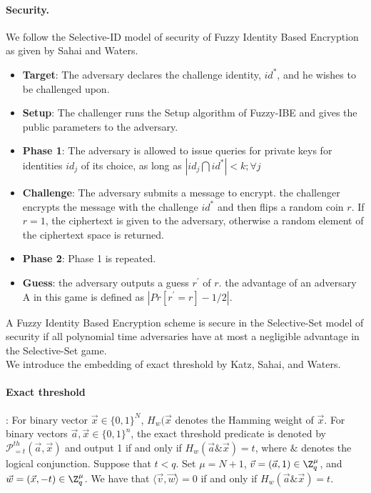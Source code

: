 \documentclass[11pt,hidelinks]{article}
\begin{document}
\begin{appendix}
\paragraph{Security.} We follow the Selective-ID model of security of Fuzzy Identity Based Encryption as given by Sahai and Waters\cite{EC:SahWat05}.
\begin{itemize}
 \item \textbf{Target}: The adversary declares the challenge identity, $id^{*}$, and he wishes to be challenged upon.
 \item \textbf{Setup}: The challenger runs the Setup algorithm of Fuzzy-IBE and gives the public parameters to the adversary.
 \item \textbf{Phase 1}: The adversary is allowed to issue queries for private keys for identities $id_{j}$ of its choice, as long as $|id_{j} \bigcap id^{*}|< k; \forall j$
 \item \textbf{Challenge}: The adversary submits a message to encrypt. the challenger encrypts the message with the challenge $id^{*}$ and then flips a random coin $r$. If $r=1$, the ciphertext is given to the adversary, otherwise a random element of the ciphertext space is returned.
 \item \textbf{Phase 2}: Phase 1 is repeated.
 \item \textbf{Guess}: the adversary outputs a guess $r^{'}$ of $r$. the advantage of an adversary A in this game is defined as $|Pr[r^{'}=r]-1/2|$.
\end{itemize}

A Fuzzy Identity Based Encryption scheme is secure in the Selective-Set model of security if all polynomial time adversaries have at most a negligible advantage in the Selective-Set game.\\[0.4cm]
We introduce the embedding of exact threshold by Katz, Sahai, and Waters\cite{EC:KatSahWat08}.
\paragraph{Exact threshold}: For binary vector $\vec{x} \in \{0,1\}^{N}$, $H_{w}(\vec{x}$ denotes the Hamming weight of $\vec{x}$. For binary vectors $\vec{a}, \vec{x} \in \{0,1\}^{n}$, the exact threshold predicate is denoted by $\mathcal{P}^{th}_{=t}(\vec{a}, \vec{x})$ and output 1 if and only if $H_{w}(\vec{a} \& \vec{x})=t$, where $\&$ denotes the logical conjunction. Suppose that $t<q$. Set $\mu=N+1$, $\vec{v}=(\vec{a}, 1) \in \Z^{\mu}_{q}$, and $\vec{w}=(\vec{x}, -t) \in \Z^{\mu}_{q}$. We have that $\langle \vec{v}, \vec{w} \rangle =0 $ if and only if $H_{w}(\vec{a} \& \vec{x})=t$.


\end{appendix}
\end{document}
